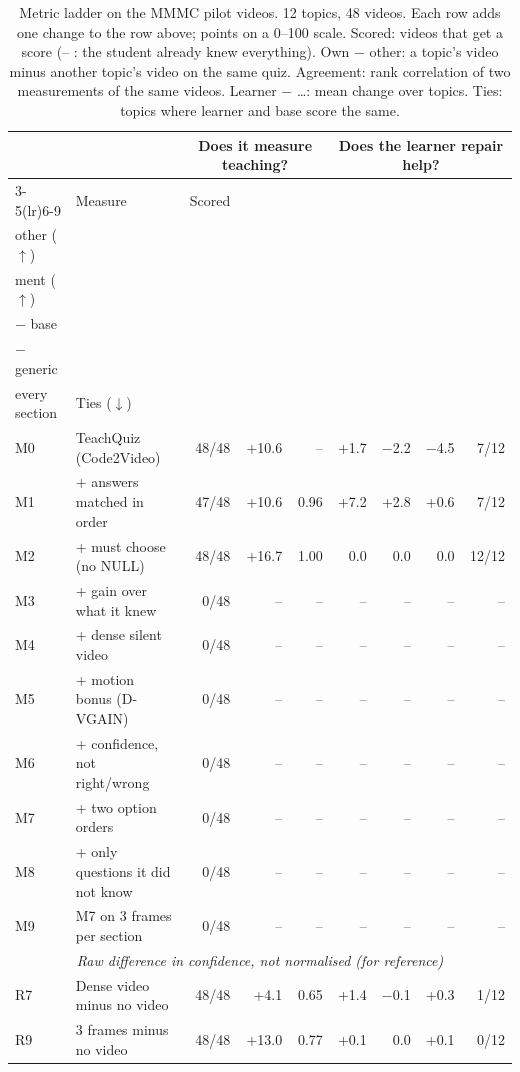 \begin{table}[t]\centering\footnotesize
\caption{Metric ladder on the MMMC pilot videos. 12 topics, 48 videos. Each row adds one change to the row above; points on a 0--100 scale. Scored: videos that get a score (-- : the student already knew everything). Own $-$ other: a topic's video minus another topic's video on the same quiz. Agreement: rank correlation of two measurements of the same videos. Learner $-$ \ldots: mean change over topics. Ties: topics where learner and base score the same.}\label{tab:ladder_mmmc}
\setlength{\tabcolsep}{4pt}\begin{tabular}{@{}llrrrrrrr@{}}\toprule & & \multicolumn{3}{c}{Does it measure teaching?} & \multicolumn{4}{c}{Does the learner repair help?}\\
\cmidrule(lr){3-5}\cmidrule(lr){6-9}
& Measure & Scored & \hd{Own $-$\\other ($\uparrow$)} & \hd{Agree-\\ment ($\uparrow$)} & \hd{Learner\\$-$ base} & \hd{Learner\\$-$ generic} & \hd{Learner $-$\\every section} & Ties ($\downarrow$)\\\midrule
M0 & TeachQuiz (Code2Video) & 48/48 & +10.6 & -- & +1.7 & $-$2.2 & $-$4.5 & 7/12 \\
M1 & + answers matched in order & 47/48 & +10.6 & 0.96 & +7.2 & +2.8 & +0.6 & 7/12 \\
M2 & + must choose (no NULL) & 48/48 & +16.7 & 1.00 & 0.0 & 0.0 & 0.0 & 12/12 \\
M3 & + gain over what it knew & 0/48 & -- & -- & -- & -- & -- & -- \\
M4 & + dense silent video & 0/48 & -- & -- & -- & -- & -- & -- \\
M5 & + motion bonus (D-VGAIN) & 0/48 & -- & -- & -- & -- & -- & -- \\
M6 & + confidence, not right/wrong & 0/48 & -- & -- & -- & -- & -- & -- \\
M7 & + two option orders & 0/48 & -- & -- & -- & -- & -- & -- \\
M8 & + only questions it did not know & 0/48 & -- & -- & -- & -- & -- & -- \\
M9 & M7 on 3 frames per section & 0/48 & -- & -- & -- & -- & -- & -- \\
\midrule
\multicolumn{9}{c}{\textit{Raw difference in confidence, not normalised (for reference)}}\\
R7 & Dense video minus no video & 48/48 & +4.1 & 0.65 & +1.4 & $-$0.1 & +0.3 & 1/12 \\
R9 & 3 frames minus no video & 48/48 & +13.0 & 0.77 & +0.1 & 0.0 & +0.1 & 0/12 \\
\bottomrule\end{tabular}
\end{table}

